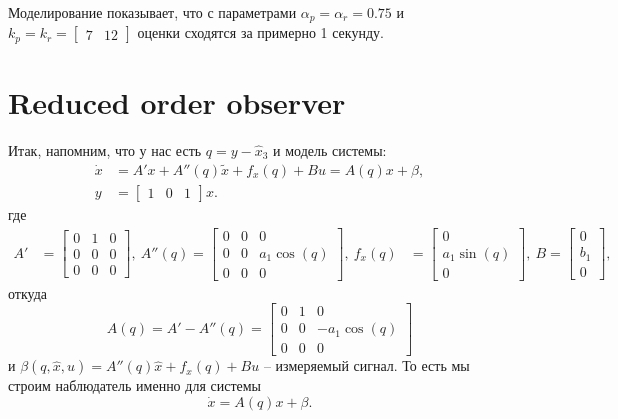 \documentclass{article}
\begin{document}
Моделирование показывает, что с параметрами $\alpha_p=\alpha_r=0.75$ и $k_p=k_r=\begin{bmatrix} 7 & 12 \end{bmatrix}$ оценки сходятся за примерно 1 секунду.


\section{Reduced order observer}
Итак, напомним, что у нас есть $q=y-\hat{x}_3$ и модель системы:
\[
	\begin{aligned}
		\dot{x} &= A'x + A''(q)\tilde{x} + f_x(q) + Bu = A(q)x + \beta, \\
		y &= \begin{bmatrix} 1 & 0 & 1 \end{bmatrix}x.
	\end{aligned}
\]
где 
\[
	\begin{aligned}
	A' &= \begin{bmatrix} 0 & 1 & 0 \\ 0 & 0 & 0 \\ 0 & 0 & 0\end{bmatrix},  
		\ A''(q) = \begin{bmatrix} 0 & 0 & 0 \\0 & 0 & a_1\cos(q) \\0 & 0 & 0\end{bmatrix},
		\ f_x(q) &= \begin{bmatrix} 0 \\ a_1\sin(q) \\ 0\end{bmatrix},
		\ B = \begin{bmatrix} 0 \\ b_1 \\ 0 \end{bmatrix},
	\end{aligned}
\]
откуда
\[
	A(q) = A' - A''(q) = \begin{bmatrix} 0 & 1 &  0\\ 0 & 0 & -a_1\cos(q)\\ 0 & 0 & 0 \end{bmatrix}
\]
и $\beta(q,\hat{x},u) =  A''(q)\hat{x} + f_x(q) + Bu$ -- измеряемый сигнал. То есть мы строим наблюдатель именно для системы
\[
	\dot{x} = A(q)x + \beta.
\]
\end{document}
